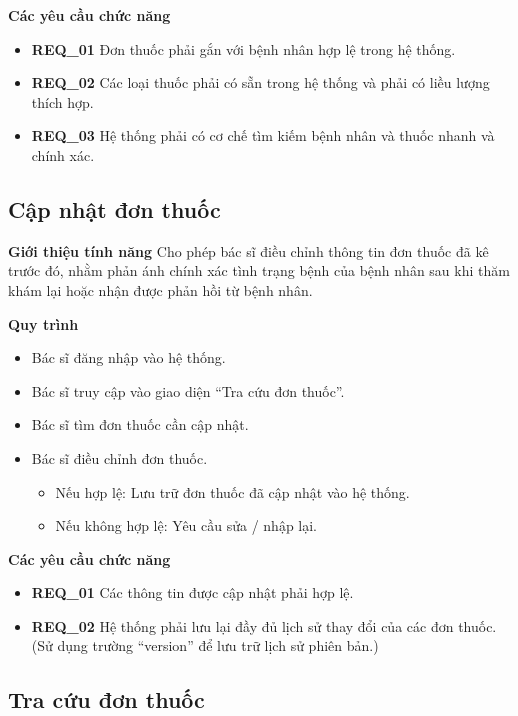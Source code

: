 \noindent \textbf{Các yêu cầu chức năng}
\begin{itemize}
    \item \textbf{REQ\_01} Đơn thuốc phải gắn với bệnh nhân hợp lệ trong hệ thống.
    \item \textbf{REQ\_02} Các loại thuốc phải có sẵn trong hệ thống và phải có liều lượng thích hợp.
    \item \textbf{REQ\_03} Hệ thống phải có cơ chế tìm kiếm bệnh nhân và thuốc nhanh và chính xác.
\end{itemize}

\subsection{Cập nhật đơn thuốc}

\noindent \textbf{Giới thiệu tính năng}
Cho phép bác sĩ điều chỉnh thông tin đơn thuốc đã kê trước đó, nhằm phản ánh chính xác tình trạng bệnh của bệnh nhân sau khi thăm khám lại hoặc nhận được phản hồi từ bệnh nhân.

\noindent \textbf{Quy trình}
\begin{itemize}
    \item Bác sĩ đăng nhập vào hệ thống.
    \item Bác sĩ truy cập vào giao diện ``Tra cứu đơn thuốc''.
    \item Bác sĩ tìm đơn thuốc cần cập nhật.
    \item Bác sĩ điều chỉnh đơn thuốc.
    \begin{itemize}
        \item Nếu hợp lệ: Lưu trữ đơn thuốc đã cập nhật vào hệ thống.
        \item Nếu không hợp lệ: Yêu cầu sửa / nhập lại.
    \end{itemize}
\end{itemize}

\noindent \textbf{Các yêu cầu chức năng} 
\begin{itemize}
    \item \textbf{REQ\_01} Các thông tin được cập nhật phải hợp lệ.
    \item \textbf{REQ\_02} Hệ thống phải lưu lại đầy đủ lịch sử thay đổi của các đơn thuốc. (Sử dụng trường ``version'' để lưu trữ lịch sử phiên bản.)
\end{itemize}

\subsection{Tra cứu đơn thuốc}

